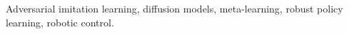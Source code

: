 \documentclass[lettersize,journal]{IEEEtran}
\begin{document}
\begin{IEEEkeywords}
Adversarial imitation learning, diffusion models, meta-learning, robust policy learning, robotic control.
\end{IEEEkeywords}


\end{document}
